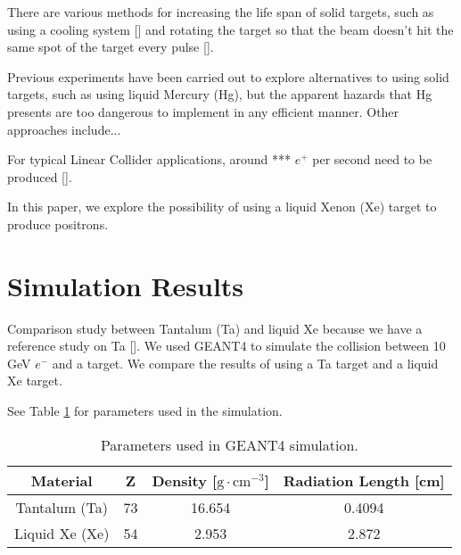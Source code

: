 \documentclass[%
reprint,
amsmath, amssymb,
aps,
]{revtex4-2}
\begin{document}
There are various methods for increasing
the life span of solid targets, such as using a cooling system [] and rotating the target so that the beam doesn't
hit the same spot of the target every pulse [].

Previous experiments have been carried out to explore alternatives to using solid targets, such as using liquid Mercury (Hg),
but the apparent hazards that Hg presents are too dangerous to implement in any efficient manner.
Other approaches include...

For typical Linear Collider applications, around *** $e^+$ per second need to be produced [].

In this paper, we explore the possibility of using a liquid Xenon (Xe) target to produce positrons.

\section{Simulation Results}
Comparison study between Tantalum (Ta) and liquid Xe because we have a reference study on Ta [].
We used GEANT4 to simulate the collision between 10 GeV $e^-$ and a target.  We compare the results of using a
Ta target and a liquid Xe target.

See Table \ref{tab:G4Params} for parameters used in the simulation.

\begin{table}[h]
    \centering
    \begin{tabular}{||c|c|c|c||}
        \hline
        Material & Z & Density [$\textrm{g} \cdot \textrm{cm}^{-3} $] & Radiation Length [cm] \\
        \hline \hline
        Tantalum (Ta) & 73 & 16.654 & 0.4094 \\
        \hline
        Liquid Xe (Xe) & 54 & 2.953 & 2.872 \\
        \hline
    \end{tabular}
    \caption{Parameters used in GEANT4 simulation.}
    \label{tab:G4Params}
\end{table}


\end{document}
